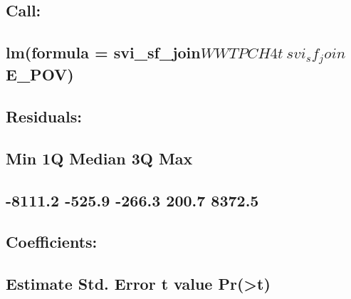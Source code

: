 \documentclass[
  12pt,
]{article}
\begin{document}
\hypertarget{call-7}{%
\subsection{Call:}\label{call-7}}

\hypertarget{lmformula-svi_sf_joinwwtpch4t-svi_sf_joine_pov}{%
\subsection{\texorpdfstring{lm(formula =
svi\_sf\_join\(WWTPCH4t ~ svi_sf_join\)E\_POV)}{lm(formula = svi\_sf\_joinWWTPCH4t \textasciitilde{} svi\_sf\_joinE\_POV)}}\label{lmformula-svi_sf_joinwwtpch4t-svi_sf_joine_pov}}

\hypertarget{section-75}{%
\subsection{}\label{section-75}}

\hypertarget{residuals-7}{%
\subsection{Residuals:}\label{residuals-7}}

\hypertarget{min-1q-median-3q-max-7}{%
\subsection{Min 1Q Median 3Q Max}\label{min-1q-median-3q-max-7}}

\hypertarget{section-76}{%
\subsection{-8111.2 -525.9 -266.3 200.7 8372.5}\label{section-76}}

\hypertarget{section-77}{%
\subsection{}\label{section-77}}

\hypertarget{coefficients-7}{%
\subsection{Coefficients:}\label{coefficients-7}}

\hypertarget{estimate-std.-error-t-value-prt-7}{%
\subsection{Estimate Std. Error t value
Pr(\textgreater\textbar t\textbar)}\label{estimate-std.-error-t-value-prt-7}}
\end{document}
